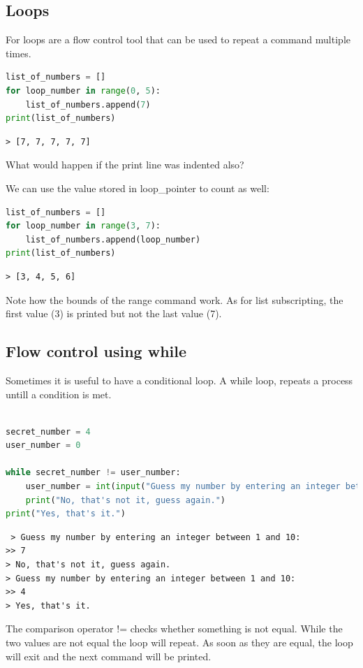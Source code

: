 	\subsection{Loops}
		For loops are a flow control tool that can be used to repeat a command multiple times.
		\begin{lstlisting}[language=Python]
list_of_numbers = []
for loop_number in range(0, 5):
	list_of_numbers.append(7)
print(list_of_numbers)\end{lstlisting}
		\begin{verbatim}> [7, 7, 7, 7, 7]\end{verbatim}

		\begin{task}What would happen if the print line was indented also?\end{task}
		We can use the value stored in loop\_pointer to count as well:
		\begin{lstlisting}[language=Python]
list_of_numbers = []
for loop_number in range(3, 7):
	list_of_numbers.append(loop_number)
print(list_of_numbers)\end{lstlisting}
\begin{verbatim}> [3, 4, 5, 6]\end{verbatim}

Note how the bounds of the range command work. As for list subscripting, the first value (3) is printed but not the last value (7).



	\subsection{Flow control using while}
		Sometimes it is useful to have a conditional loop. A while loop, repeats a process untill a condition is met.
\begin{lstlisting}[language=Python]

secret_number = 4
user_number = 0

while secret_number != user_number:
	user_number = int(input("Guess my number by entering an integer between 1 and 10: "
	print("No, that's not it, guess again.")
print("Yes, that's it.")\end{lstlisting}
		\begin{verbatim} > Guess my number by entering an integer between 1 and 10: 
>> 7
> No, that's not it, guess again.
> Guess my number by entering an integer between 1 and 10:
>> 4
> Yes, that's it.\end{verbatim}
		The comparison operator != checks whether something is not equal. While the two values are not equal the loop will repeat. As soon as they are equal, the loop will exit and the next command will be printed.




